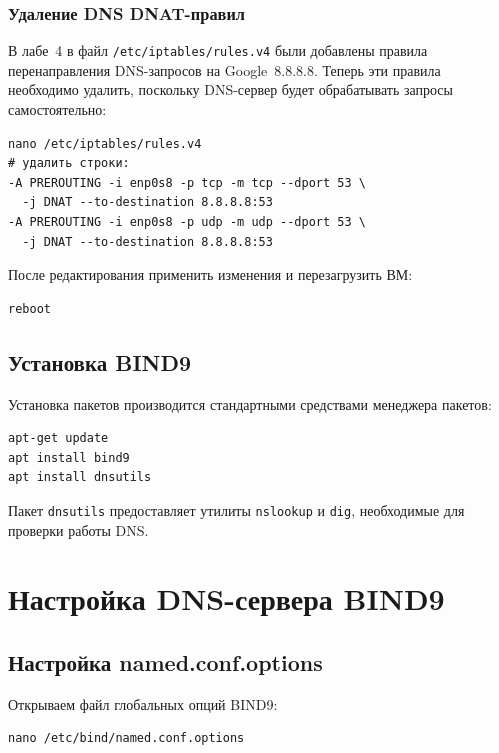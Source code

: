 \documentclass[a4paper,14pt,oneside,openany]{memoir}
\begin{document}
\subsection{Удаление DNS DNAT-правил}

В лабе~4 в файл \texttt{/etc/iptables/rules.v4} были добавлены правила перенаправления DNS-запросов на Google~8.8.8.8. Теперь эти правила необходимо удалить, поскольку DNS-сервер будет обрабатывать запросы самостоятельно:
\begin{lstlisting}
nano /etc/iptables/rules.v4
# удалить строки:
-A PREROUTING -i enp0s8 -p tcp -m tcp --dport 53 \
  -j DNAT --to-destination 8.8.8.8:53
-A PREROUTING -i enp0s8 -p udp -m udp --dport 53 \
  -j DNAT --to-destination 8.8.8.8:53
\end{lstlisting}

После редактирования применить изменения и перезагрузить ВМ:
\begin{lstlisting}
reboot
\end{lstlisting}

\section{Установка BIND9}

Установка пакетов производится стандартными средствами менеджера пакетов:
\begin{lstlisting}
apt-get update
apt install bind9
apt install dnsutils
\end{lstlisting}

Пакет \texttt{dnsutils} предоставляет утилиты \texttt{nslookup} и \texttt{dig}, необходимые для проверки работы DNS.

\chapter{Настройка DNS-сервера BIND9}
\label{ch:config}

\section{Настройка named.conf.options}

Открываем файл глобальных опций BIND9:
\begin{lstlisting}
nano /etc/bind/named.conf.options
\end{lstlisting}
\end{document}
